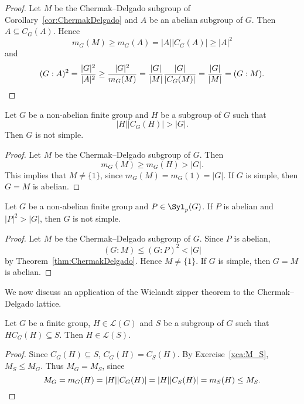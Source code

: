\begin{proof}
	Let $M$ be the Chermak--Delgado subgroup of Corollary~\ref{cor:ChermakDelgado} 
    and $A$ be an abelian subgroup of 
	$G$. Then $A\subseteq C_G(A)$. Hence 
	\[
		m_G(M)\geq m_G(A)=|A||C_G(A)|\geq|A|^2
	\]
	and 
	\[
	(G:A)^2
	=\frac{|G|^2}{|A|^2}\geq\frac{|G|^2}{m_G(M)}
	=\frac{|G|}{|M|}\frac{|G|}{|C_G(M)|}
	=\frac{|G|}{|M|}
	=(G:M).\qedhere 
	\]
\end{proof}

\begin{corollary}
	Let $G$ be a non-abelian finite group and $H$ be a subgroup of $G$ such that 
	\[
	|H||C_G(H)|>|G|.
	\]
	Then $G$ is not simple. 
\end{corollary}

\begin{proof}
	Let $M$ be the Chermak--Delgado subgroup of $G$. 
	Then 
	\begin{equation}
		\label{equation:mG}
	m_G(M)\geq m_G(H)>|G|.
	\end{equation}
	This implies that $M\ne\{1\}$, since $m_G(M)=m_G(1)=|G|$. If $G$ is simple, then $G=M$ is abelian. 
\end{proof}

\begin{corollary}
	Let $G$ be a non-abelian finite group and $P\in\Syl_p(G)$. If $P$ is abelian and $|P|^2>|G|$, then $G$ is not simple. 
\end{corollary}

\begin{proof}
	Let $M$ be the Chermak--Delgado subgroup of $G$. Since $P$ is abelian, 
    \[
    (G:M)\leq (G:P)^2<|G|
    \]
    by Theorem~\ref{thm:ChermakDelgado}. Hence 
    $M\ne\{1\}$. If $G$ is simple, then $G=M$ is abelian. 
\end{proof}

We now discuss an application of the Wielandt zipper theorem 
to the Chermak--Delgado lattice. 

\begin{lemma}
	\label{lem:L(G)L(S)}
	Let $G$ be a finite group, $H\in\mathcal{L}(G)$ and  $S$ be a subgroup of $G$ such that 
	$HC_G(H)\subseteq S$. Then $H\in\mathcal{L}(S)$.
\end{lemma}

\begin{proof}
	Since $C_G(H)\subseteq S$, $C_G(H)=C_S(H)$. By Exercise~\ref{xca:M_S},
    $M_S\leq M_G$. Thus $M_G=M_S$, since 
	\[
		M_G=m_G(H)=|H||C_G(H)|=|H||C_S(H)|=m_S(H)\leq M_S.\qedhere 
	\]
\end{proof}

